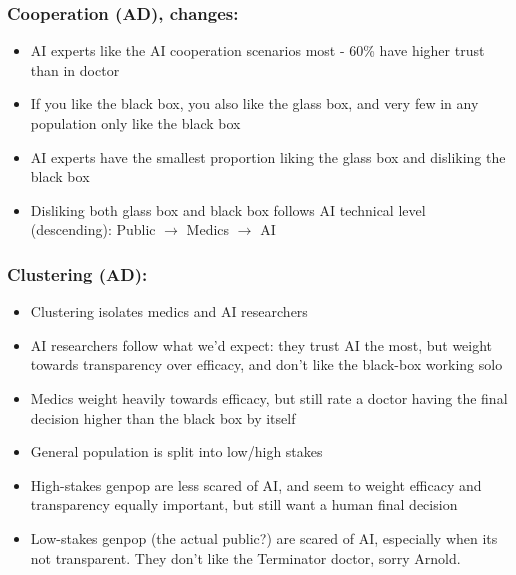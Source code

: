 \documentclass[manuscript,screen,review]{acmart}
\begin{document}

\subsubsection{Cooperation (AD), changes:}
\begin{itemize}
    \item AI experts like the AI cooperation scenarios most - 60\% have higher trust than in doctor
    \item If you like the black box, you also like the glass box, and very few in any population only like the black box
    \item AI experts have the smallest proportion liking the glass box and disliking the black box
    \item Disliking both glass box and black box follows AI technical level (descending): Public $\rightarrow$ Medics $\rightarrow$ AI
\end{itemize}

\subsubsection{Clustering (AD):}
\begin{itemize}
    \item Clustering isolates medics and AI researchers
    \item AI researchers follow what we'd expect: they trust AI the most, but weight towards transparency over efficacy, and don't like the black-box working solo
    \item Medics weight heavily towards efficacy, but still rate a doctor having the final decision higher than the black box by itself
    \item General population is split into low/high stakes
    \item High-stakes genpop are less scared of AI, and seem to weight efficacy and transparency equally important, but still want a human final decision
    \item Low-stakes genpop (the actual public?) are scared of AI, especially when its not transparent. They don't like the Terminator doctor, sorry Arnold.
\end{itemize}

\end{document}
